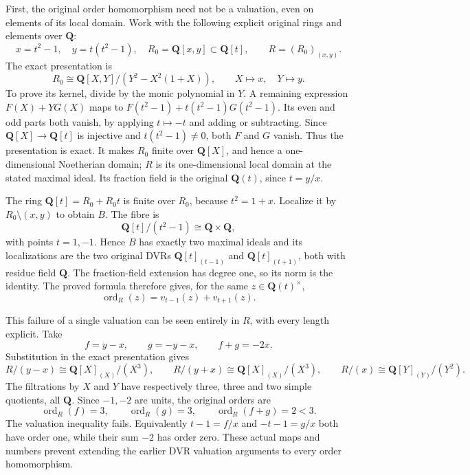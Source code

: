 First, the original order homomorphism need not be a valuation, even on elements of its local domain. Work with the following explicit original rings and elements over \(\mathbf Q\): \[
 x=t^2-1,\quad y=t(t^2-1),\quad
 R_0=\mathbf Q[x,y]\subset\mathbf Q[t],\qquad
 R=(R_0)_{(x,y)}.
\] The exact presentation is \[
 R_0\cong\mathbf Q[X,Y]/(Y^2-X^2(1+X)),
 \qquad X\mapsto x,\quad Y\mapsto y.
\] To prove its kernel, divide by the monic polynomial in \(Y\). A remaining expression \(F(X)+YG(X)\) maps to \(F(t^2-1)+t(t^2-1)G(t^2-1)\). Its even and odd parts both vanish, by applying \(t\mapsto-t\) and adding or subtracting. Since \(\mathbf Q[X]\to\mathbf Q[t]\) is injective and \(t(t^2-1)\ne0\), both \(F\) and \(G\) vanish. Thus the presentation is exact. It makes \(R_0\) finite over \(\mathbf Q[X]\), and hence a one-dimensional Noetherian domain; \(R\) is its one-dimensional local domain at the stated maximal ideal. Its fraction field is the original \(\mathbf Q(t)\), since \(t=y/x\).

The ring \(\mathbf Q[t]=R_0+R_0t\) is finite over \(R_0\), because \(t^2=1+x\). Localize it by \(R_0\setminus(x,y)\) to obtain \(B\). The fibre is \[
 \mathbf Q[t]/(t^2-1)\cong\mathbf Q\times\mathbf Q,
\] with points \(t=1,-1\). Hence \(B\) has exactly two maximal ideals and its localizations are the two original DVRs \(\mathbf Q[t]_{(t-1)}\) and \(\mathbf Q[t]_{(t+1)}\), both with residue field \(\mathbf Q\). The fraction-field extension has degree one, so its norm is the identity. The proved formula therefore gives, for the same \(z\in\mathbf Q(t)^\times\), \[
 \operatorname{ord}_R(z)=v_{t-1}(z)+v_{t+1}(z).
\]

This failure of a single valuation can be seen entirely in \(R\), with every length explicit. Take \[
 f=y-x,\qquad g=-y-x,\qquad f+g=-2x.
\] Substitution in the exact presentation gives \[
 R/(y-x)\cong\mathbf Q[X]_{(X)}/(X^3),\qquad
 R/(y+x)\cong\mathbf Q[X]_{(X)}/(X^3),\qquad
 R/(x)\cong\mathbf Q[Y]_{(Y)}/(Y^2).
\] The filtrations by \(X\) and \(Y\) have respectively three, three and two simple quotients, all \(\mathbf Q\). Since \(-1,-2\) are units, the original orders are \[
 \operatorname{ord}_R(f)=3,\qquad
 \operatorname{ord}_R(g)=3,\qquad
 \operatorname{ord}_R(f+g)=2<3.
\] The valuation inequality fails. Equivalently \(t-1=f/x\) and \(-t-1=g/x\) both have order one, while their sum \(-2\) has order zero. These actual maps and numbers prevent extending the earlier DVR valuation arguments to every order homomorphism.

